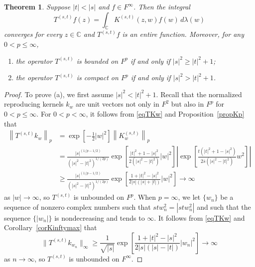 \documentclass[reqno]{amsart}
\newtheorem{theorem}{Theorem}%
\newcommand{\C}{{\mathbb C}}
\newcommand{\inc}{\int_{\C}}
\begin{document}
\begin{theorem}\label{thmTBp}
Suppose $|t|<|s|$ and $f\in F^\infty$. Then the integral
$$T^{(s,t)}f(z)=\inc K^{(s,t)}(z,w)f(w)\,d\lambda(w)$$
converges for every $z\in\C$ and $T^{(s,t)}f$ is an entire function.
Moreover, for any $0<p\le\infty$,
\begin{enumerate}
\item[(a)] the operator $T^{(s, t)}$ is bounded on
$F^p$ if and only if $|s|^2\ge|t|^2+1$;
\item[(b)] the operator $T^{(s,t)}$ is compact on $F^p$
if and only if $|s|^2>|t|^2+1$.
\end{enumerate}
\end{theorem}

\begin{proof}
To prove (a), we first assume $|s|^2<|t|^2+1$. Recall that the normalized
reproducing kernels $k_w$ are unit vectors not only in $F^2$ but also in
$F^p$ for $0<p\le\infty$. For $0<p<\infty$, it follows from \eqref{eqTKw} 
and Proposition~\ref{propKp} that
\begin{align*}
\left\|T^{(s,t)}k_w\right\|_p&=\exp\left[-\frac{1}{2}|w|^2\right]
\left\|K^{(s,t)}_w\right\|_p\\[8pt]
&=\frac{|s|^{(1/p-1/2)}}{(|s|^2-|t|^2)^{1/(2p)}}\exp\left[
\frac{|t|^2+1-|s|^2}{2(|s|^2-|t|^2)}|{w}|^2\right]\left|\exp\left
[\frac{t(|t|^2+1-|s|^2)}{2\overline{s}(|s|^2-|t|^2)}{w^2}\right]\right|\\[8pt]
&\geq \frac{|s|^{(1/p-1/2)}}{(|s|^2-|t|^2)^{1/(2p)}}\exp
\left[\frac{1+|t|^2-|s|^2}{2|s|(|s|+|t|)}|w|^2\right]\rightarrow\infty
\end{align*}
as $|w|\rightarrow\infty$, so $T^{(s,t)}$ is unbounded on $F^p$.
When $p=\infty$, we let $\{w_n\}$ be a sequence of nonzero complex
numbers such that $stw_n^2=|stw_n^2|$ and such that the sequence
$\{|w_n|\}$ is nondecreasing and tends to $\infty$. It follows from
\eqref{eqTKw} and Corollary~\ref{corKinftymax} that
$$\|T^{(s,t)}k_{w_n}\|_\infty\geq\frac{1}{\sqrt{|s|}}\exp
\left[\frac{1+|t|^2-|s|^2}{2|s|(|s|-|t|)}|w_n|^2\right]\rightarrow\infty$$
as $n\rightarrow\infty$, so $T^{(s,t)}$ is unbounded on $F^\infty$.


\end{proof}
\end{document}
